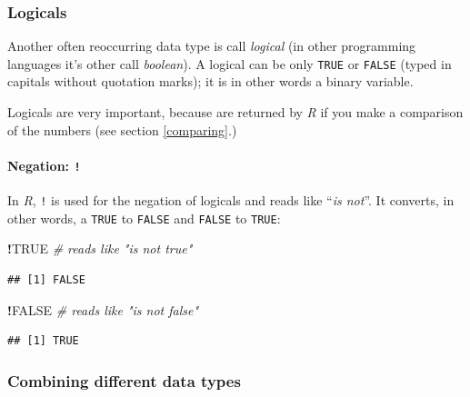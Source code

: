\documentclass[
]{scrartcl}
\newenvironment{Shaded}{\begin{snugshade}}{\end{snugshade}}
\newcommand{\CommentTok}[1]{\textcolor[rgb]{0.56,0.35,0.01}{\textit{#1}}}
\newcommand{\ConstantTok}[1]{\textcolor[rgb]{0.56,0.35,0.01}{#1}}
\newcommand{\SpecialCharTok}[1]{\textcolor[rgb]{0.81,0.36,0.00}{\textbf{#1}}}
\begin{document}
\subsubsection{Logicals}\label{logicals}

Another often reoccurring data type is call \emph{logical} (in other programming languages it's other call \emph{boolean}). A logical can be only \texttt{TRUE} or \texttt{FALSE} (typed in capitals without quotation marks); it is in other words a binary variable.

Logicals are very important, because are returned by \emph{R} if you make a comparison of the numbers (see section \ref{comparing}.)

\paragraph*{\texorpdfstring{Negation: \texttt{!}}{Negation: !}}\label{negation}

In \emph{R}, \texttt{!} is used for the negation of logicals and reads like ``\emph{is not}''. It converts, in other words, a \texttt{TRUE} to \texttt{FALSE} and \texttt{FALSE} to \texttt{TRUE}:

\begin{Shaded}
\begin{Highlighting}[]
\SpecialCharTok{!}\ConstantTok{TRUE}    \CommentTok{\#  reads like "is not true"}
\end{Highlighting}
\end{Shaded}

\begin{verbatim}
## [1] FALSE
\end{verbatim}

\begin{Shaded}
\begin{Highlighting}[]
\SpecialCharTok{!}\ConstantTok{FALSE}   \CommentTok{\#  reads like "is not false"}
\end{Highlighting}
\end{Shaded}

\begin{verbatim}
## [1] TRUE
\end{verbatim}

\subsubsection{Combining different data types}\label{comparediffdata}
\end{document}
